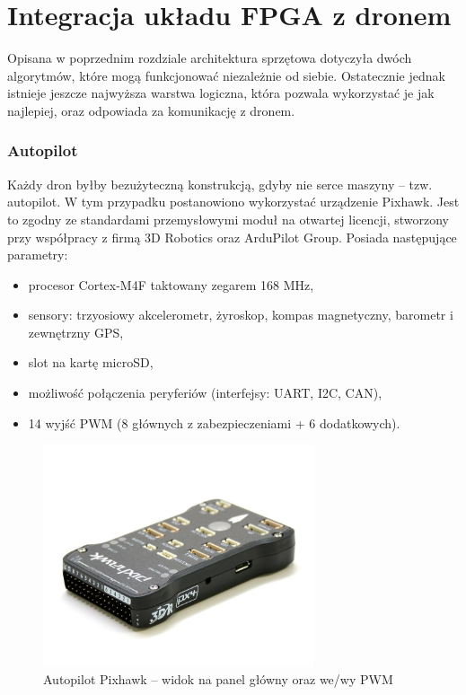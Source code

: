 \chapter{Integracja układu FPGA z dronem}

Opisana w poprzednim rozdziale architektura sprzętowa dotyczyła dwóch algorytmów, które mogą funkcjonować niezależnie od siebie. 
Ostatecznie jednak istnieje jeszcze najwyższa warstwa logiczna, która pozwala wykorzystać je jak najlepiej, oraz odpowiada za komunikację z dronem.


\subsection{Autopilot}

Każdy dron byłby bezużyteczną konstrukcją, gdyby nie serce maszyny -- tzw. autopilot. 
W tym przypadku postanowiono wykorzystać urządzenie Pixhawk. 
Jest to zgodny ze standardami przemysłowymi moduł na otwartej licencji, stworzony przy współpracy z firmą 3D Robotics oraz ArduPilot Group. 
Posiada następujące parametry:
\begin{itemize}
	\item procesor Cortex-M4F taktowany zegarem 168 MHz,
	\item sensory: trzyosiowy akcelerometr, żyroskop, kompas magnetyczny, barometr i zewnętrzny GPS,
	\item slot na kartę microSD,
	\item możliwość połączenia peryferiów (interfejsy: UART, I2C, CAN),
	\item 14 wyjść PWM (8 głównych z zabezpieczeniami + 6 dodatkowych).
\end{itemize}

\begin{figure}[h]
	\centering
	\includegraphics[width=8cm]{5_pixhawk.jpg}
	\caption{Autopilot Pixhawk -- widok na panel główny oraz we/wy PWM}
	\label{fig:pixhawk}
\end{figure}

